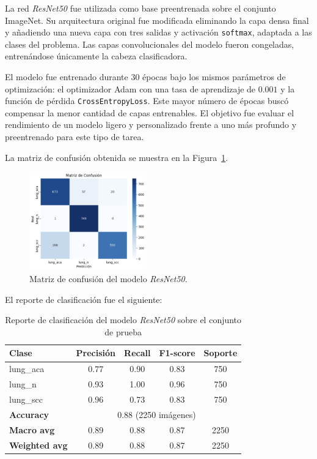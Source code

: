 \documentclass[conference]{IEEEtran}
\begin{document}
La red \textit{ResNet50} fue utilizada como base preentrenada sobre el conjunto ImageNet. Su arquitectura original fue modificada eliminando la capa densa final y añadiendo una nueva capa con tres salidas y activación \texttt{softmax}, adaptada a las clases del problema. Las capas convolucionales del modelo fueron congeladas, entrenándose únicamente la cabeza clasificadora.

El modelo fue entrenado durante 30 épocas bajo los mismos parámetros de optimización: el optimizador Adam con una tasa de aprendizaje de $0.001$ y la función de pérdida \texttt{CrossEntropyLoss}. Este mayor número de épocas buscó compensar la menor cantidad de capas entrenables. El objetivo fue evaluar el rendimiento de un modelo ligero y personalizado frente a uno más profundo y preentrenado para este tipo de tarea.



La matriz de confusión obtenida se muestra en la Figura~\ref{fig:confmatrix_resnet50}.

\begin{figure}[ht]
\centering
\includegraphics[width=0.45\textwidth]{figs/confusion_matrix_resnet50.png}
\caption{Matriz de confusión del modelo \textit{ResNet50}.}
\label{fig:confmatrix_resnet50}
\end{figure}

El reporte de clasificación fue el siguiente:

\begin{table}[ht]
\centering
\caption{Reporte de clasificación del modelo \textit{ResNet50} sobre el conjunto de prueba}
\begin{tabular}{|l|c|c|c|c|}
\hline
\textbf{Clase} & \textbf{Precisión} & \textbf{Recall} & \textbf{F1-score} & \textbf{Soporte} \\
\hline
lung\_aca      & 0.77 & 0.90 & 0.83 & 750 \\
lung\_n        & 0.93 & 1.00 & 0.96 & 750 \\
lung\_scc      & 0.96 & 0.73 & 0.83 & 750 \\
\hline
\textbf{Accuracy} & \multicolumn{4}{c|}{0.88 (2250 imágenes)} \\
\textbf{Macro avg} & 0.89 & 0.88 & 0.87 & 2250 \\
\textbf{Weighted avg} & 0.89 & 0.88 & 0.87 & 2250 \\
\hline
\end{tabular}
\label{tab:clasresnet50}
\end{table}
\end{document}
